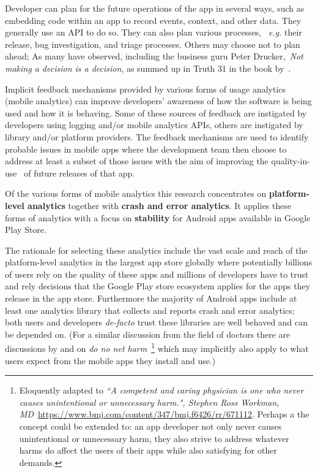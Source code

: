Developer can plan for the future operations of the app in several ways, such as embedding code within an app to record events, context, and other data. They generally use an API to do so. They can also plan various processes, ~\emph{e.g.} their release, bug investigation, and triage processes. Others may choose not to plan ahead; As many have observed, including the business guru Peter Drucker,~\emph{Not making a decision is a decision}, as summed up in Truth 31 in the book by~\cite{gunther2013truth_about_better_decision_making}.

Implicit feedback mechanisms provided by various forms of usage analytics (mobile analytics) can improve developers' awareness of how the software is being used and how it is behaving. Some of these sources of feedback are instigated by developers using logging and/or mobile analytics APIs, others are instigated by library and/or platform providers. The feedback mechanisms are used to identify probable issues in mobile apps where the development team then choose to address at least a subset of those issues with the aim of improving the quality-in-use~\citep{bevan1999_89_quality_in_use_meeting_user_needs_for_quality} of future releases of that app. 

Of the various forms of mobile analytics this research concentrates on \textbf{platform-level analytics} together with \textbf{crash and error analytics}. It applies these forms of analytics with a focus on \textbf{stability} for Android apps available in Google Play Store.

The rationale for selecting these analytics include the vast scale and reach of the platform-level analytics in the largest app store globally where potentially billions of users rely on the quality of these apps and millions of developers have to trust and rely decisions that the Google Play store ecosystem applies for the apps they release in the app store. Furthermore the majority of Android apps include at least one analytics library that collects and reports crash and error analytics; both users and developers \emph{de-facto} trust these libraries are well behaved and can be depended on. (For a similar discussion from the field of doctors there are discussions by \citealt{Schuenemann2011_guidelines2_0_do_no_net_harm} and \citealt{Sokolf6426_2013_first_do_no_harm_revisited} on \emph{do no net harm}~\footnote{Eloquently adapted to \emph{``A competent and caring physician is one who never causes unintentional or unnecessary harm.", Stephen Ross Workman, MD}~\url{https://www.bmj.com/content/347/bmj.f6426/rr/671112}. Perhaps a the concept could be extended to: an app developer not only never causes unintentional or unnecessary harm, they also strive to address whatever harms do affect the users of their apps while also satisfying for other demands.} which may implicitly also apply to what users expect from the mobile apps they install and use.)


